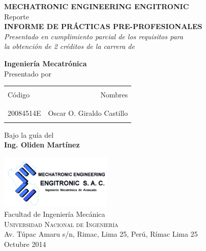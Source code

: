 \begin{titlepage}

\begin{center}

\textup{\small {\bf MECHATRONIC ENGINEERING ENGITRONIC} \\ Reporte}\\[0.2in]

\Large \textbf {INFORME DE PRÁCTICAS PRE-PROFESIONALES}\\[0.5in]

       \small \emph{Presentado en cumplimiento parcial de los requisitos para\\
        la obtención de 2 créditos de la carrera de}
        \vspace{.2in}

       {\bf Ingeniería Mecatrónica}\\[0.5in]

\normalsize Presentado por \\
\begin{table}[h]
\centering
\begin{tabular}{lr}\hline \\
Código & Nombres \\ \\ \hline
\\
20084514E & Oscar O. Giraldo Castillo \\ \\ \hline 
\end{tabular}
\end{table}

\vspace{.1in}
Bajo la guía del\\
{\textbf{Ing. Oliden Martínez}}\\[0.2in]

\vfill

\includegraphics[width=0.4\textwidth]{images/engitronic.png}\\[0.1in]
\Large{Facultad de Ingeniería Mecánica}\\
\normalsize
\textsc{Universidad Nacional de Ingeniería}\\
Av. Túpac Amaru s/n, Rimac, Lima 25, Perú, Rímac Lima 25 \\
\vspace{0.2cm}
Octubre 2014

\end{center}

\end{titlepage}
